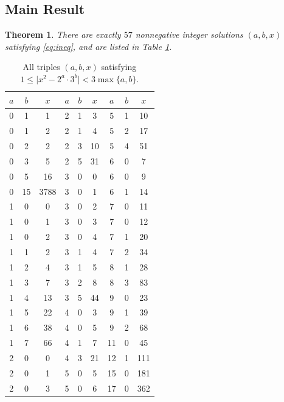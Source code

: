 \documentclass[11pt,a4paper]{article}
\newtheorem{theorem}{Theorem}[section]
\numberwithin{equation}{section}
\numberwithin{table}{section}
\numberwithin{figure}{section}
\begin{document}
\subsection{Main Result}
\begin{theorem}\label{thm:main}
	There are exactly $57$ nonnegative integer solutions $(a, b, x)$ satisfying \eqref{eq:ineq}, and are listed in Table \ref{tab:small}.
\end{theorem}

\begin{table}[H]
	\centering
	\label{tab:small}
	\renewcommand{\arraystretch}{1.25}
	\begin{tabular}{ccc|ccc|ccc}
		\toprule
		$a$ & $b$ & $x$ & $a$ & $b$ & $x$ & $a$ & $b$ & $x$ \\
		\midrule
		0  &  1 &    1 &  2 &  1 &    3 &  5 &  1 &   10 \\
		0  &  1 &    2 &  2 &  1 &    4 &  5 &  2 &    17 \\
		0  &  2 &    2 &  2 &  3 &    10 &  5 &  4 &    51 \\
		0  &  3 &    5 &  2 &  5 &   31 &  6 &  0 &   7 \\
		0  &  5 &   16 &  3 &  0 &   0 &  6 &  0 &   9 \\
		0  & 15 & 3788 &  3 &  0 &    1 &  6 &  1 &   14 \\
		1  &  0 &    0 &  3 &  0 &    2 &  7 &  0 &    11 \\
		1  &  0 &    1 &  3 &  0 &    3 &  7 &  0 &    12 \\
		1  &  0 &    2 &  3 &  0 &    4 &  7 &  1 &   20 \\
		1  &  1 &    2 &  3 &  1 &    4 &  7 &  2 &   34 \\
		1  &  2 &    4 &  3 &  1 &    5 &  8 &  1 &   28 \\
		1  &  3 &    7 &  3 &  2 &    8 &  8 &  3 &   83 \\
		1  &  4 &   13 &  3 &  5 &    44 &  9 &  0 &   23 \\
		1  &  5 &   22 &  4 &  0 &   3 &  9 &  1 &   39 \\
		1  &  6 &   38 &  4 &  0 &    5 &  9 &  2 &   68 \\
		1  &  7 &   66 &  4 &  1 &    7 &  11 &  0 &   45 \\
		2  &  0 &    0 &  4 &  3 &    21 &  12 &  1 &   111 \\
		2  &  0 &    1 &  5&  0&  5&  15 &  0 &   181 \\
		2  &  0 &    3 &  5&  0&  6& 17 &  0 &   362 \\
		\bottomrule
	\end{tabular}	
	\caption{All triples $(a, b, x)$ satisfying $1 \leq \lvert x^2 - 2^a\cdot 3^b\rvert < 3\max\{a,b\}$.}
\end{table}
\end{document}

